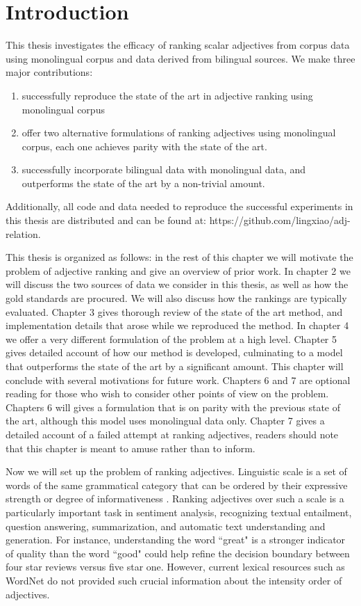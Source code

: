 \section{Introduction}

This thesis investigates the efficacy of ranking scalar adjectives from corpus data using monolingual corpus and data derived from bilingual sources. We make three major contributions:

\begin{enumerate}
	\item successfully reproduce the state of the art in adjective ranking using monolingual corpus
	\item offer two alternative formulations of ranking adjectives using monolingual corpus, each one achieves parity with the state of the art. 
	\item successfully incorporate bilingual data with monolingual data, and outperforms the state of the art by a non-trivial amount.
\end{enumerate}

Additionally, all code and data needed to reproduce the successful experiments in this thesis are distributed and can be found at: https://github.com/lingxiao/adj-relation. 

This thesis is organized as follows: in the rest of this chapter we will motivate the problem of adjective ranking and give an overview of prior work. In chapter 2 we will discuss the two sources of data we consider in this thesis, as well as how the gold standards are procured. We will also discuss how the rankings are typically evaluated. Chapter 3 gives thorough review of the state of the art method, and implementation details that arose while we reproduced the method. In chapter 4 we offer a very different formulation of the problem at a high level. Chapter 5 gives detailed account of how our method is developed, culminating to a model that outperforms the state of the art by a significant amount. This chapter will conclude with several motivations for future work. Chapters 6 and 7 are optional reading for those who wish to consider other points of view on the problem. Chapters 6 will gives a formulation that is on parity with the previous state of the art, although this model uses monolingual data only. Chapter 7 gives a detailed account of a failed attempt at ranking adjectives, readers should note that this chapter is meant to amuse rather than to inform.  

Now we will set up the problem of ranking adjectives. Linguistic scale is a set of words of the same grammatical category that can be ordered by their expressive strength or degree of informativeness \cite{sheinman2009adjscales}. Ranking adjectives over such a scale is a particularly important task in sentiment analysis, recognizing textual entailment, question answering, summarization, and automatic text understanding and generation. For instance, understanding the word ``great" is a stronger indicator of quality than the word ``good" could help refine the decision boundary between four star reviews versus five star one. However, current lexical resources such as WordNet do not provided such crucial information about the intensity order of adjectives.


